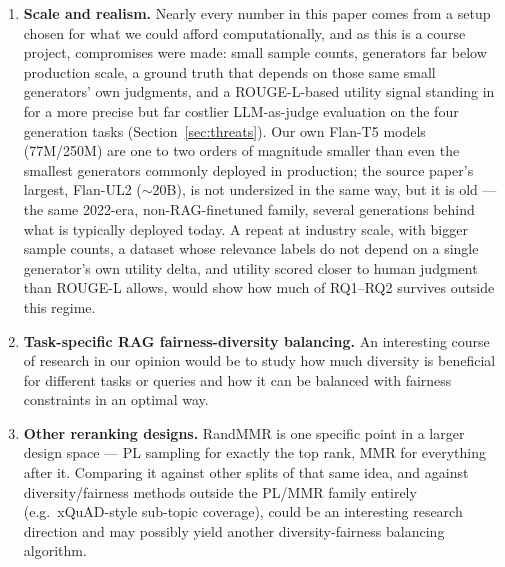 \documentclass[10pt,twocolumn]{article}
\begin{document}
\begin{enumerate}[leftmargin=1.1em,itemsep=3pt]
  \item \textbf{Scale and realism.} Nearly every number in this paper comes
  from a setup chosen for what we could afford computationally, and as this is a course project, compromises were made:
  small sample counts, generators far below production scale, a ground
  truth that depends on those same small generators' own judgments, and a
  ROUGE-L-based utility signal standing in for a more precise but far costlier
  LLM-as-judge evaluation on the four generation tasks (Section~\ref{sec:threats}).
  Our own Flan-T5 models (77M/250M) are one to two
  orders of magnitude smaller than even the smallest generators commonly
  deployed in production; the source paper's largest, Flan-UL2 ($\sim$20B), is
  not undersized in the same way, but it is old --- the same 2022-era,
  non-RAG-finetuned family, several generations behind what is typically
  deployed today. A repeat at industry scale, with bigger sample counts, a
  dataset whose relevance labels do not depend on a single generator's own
  utility delta, and utility scored closer to human judgment than ROUGE-L
  allows, would show how much of RQ1--RQ2 survives outside this regime.
  \item \textbf{Task-specific RAG fairness-diversity balancing.} An interesting course of research in our opinion would be to study how much diversity is beneficial for different tasks or queries and how it can be balanced with fairness constraints in an optimal way.
  \item \textbf{Other reranking designs.} RandMMR is one specific point in a
  larger design space --- PL sampling for exactly the top rank, MMR for
  everything after it. Comparing it against other splits of that same idea,
  and against diversity/fairness methods outside the PL/MMR family entirely
  (e.g.\ xQuAD-style sub-topic coverage), could be an interesting research direction and may possibly yield another diversity-fairness balancing algorithm.
\end{enumerate}
\end{document}
